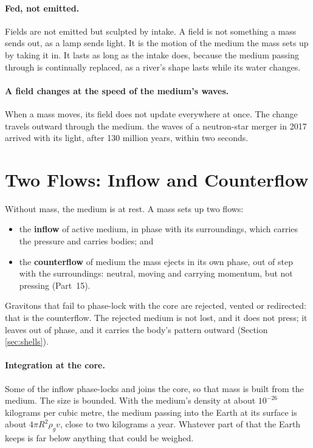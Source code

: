 \documentclass[11pt,a4paper]{article}
\begin{document}
\paragraph{Fed, not emitted.} Fields are not emitted but sculpted by intake. A field is not something a mass sends out, as a lamp sends light. It is the motion of the medium the mass sets up by taking it in. It lasts as long as the intake does, because the medium passing through is continually replaced, as a river's shape lasts while its water changes.

\paragraph{A field changes at the speed of the medium's waves.} When a mass moves, its field does not update everywhere at once. The change travels outward through the medium.  the waves of a neutron-star merger in 2017 arrived with its light, after 130 million years, within two seconds.

\section{Two Flows: Inflow and Counterflow}
\label{sec:flows}

\begin{hypbar}
Without mass, the medium is at rest. A mass sets up two flows:
\begin{itemize}
\item the \textbf{inflow} of active medium, in phase with its surroundings, which carries the pressure and carries bodies; and
\item the \textbf{counterflow} of medium the mass ejects in its own phase, out of step with the surroundings: neutral, moving and carrying momentum, but not pressing (Part~15).
\end{itemize}
\end{hypbar}

Gravitons that fail to phase-lock with the core are rejected, vented or redirected: that is the counterflow. The rejected medium is not lost, and it does not press; it leaves out of phase, and it carries the body's pattern outward (Section \ref{sec:shells}).

\paragraph{Integration at the core.} Some of the inflow phase-locks and joins the core, so that mass is built from the medium.  The size is bounded. With the medium's density at about $10^{-26}$ kilograms per cubic metre, the medium passing into the Earth at its surface is about $4\pi R^2 \rho_g v$, close to two kilograms a year. Whatever part of that the Earth keeps is far below anything that could be weighed. 
\end{document}
